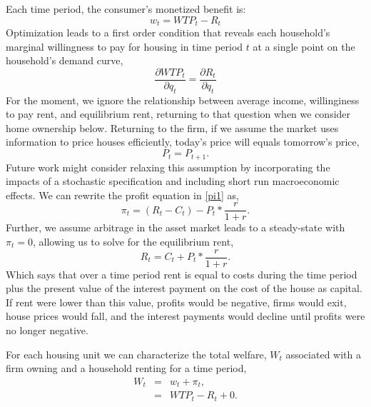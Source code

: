 \documentclass[ecta,nameyear,draft]{econsocart}
\theoremstyle{plain}
\theoremstyle{remark}
\begin{document}
Each time period, the consumer’s monetized benefit is:
\begin{equation*}
	 w_t=\mathit{WTP}_t-R_t
\end{equation*}
Optimization leads to a first order condition that reveals each household's marginal willingness
to pay for housing in time period $t$ at a single point on the household’s demand curve,
\begin{equation}
	\frac{\partial \mathit{WTP}_t}{\partial q_t}=\frac{\partial R_t}{\partial q_t} \label{foc}
\end{equation}
For the moment, we ignore the relationship between average income, willinginess to pay rent, and equilibrium rent, returning to that question when we consider home ownership below. Returning to the firm, if we assume the market uses information to price houses efficiently, today’s price will equals tomorrow’s
price,
\begin{equation*}
	P_t=P_{t+1}.
\end{equation*}
Future work might consider relaxing this assumption by incorporating the impacts of a stochastic
specification and including short run macroeconomic effects.
We can rewrite the profit equation in \ref{pi1} as,
\begin{equation}
	\pi_t=(R_t-C_t)-P_t*\frac{r}{1+r}.\label{pi1.1}
\end{equation}
Further, we assume arbitrage in the asset market leads to a steady-state with $\pi_t=0$, allowing us to solve for the equilibrium rent,
\begin{equation*}
	R_t=C_t+P_t*\frac{r}{1+r}.
\end{equation*}
Which says that over a time period rent is equal to costs during the time period plus the present value of
the interest payment on the cost of the house as capital. If rent were lower than this value, profits
would be negative, firms would exit, house prices would fall, and the interest payments would decline until profits were no longer negative.

For each housing unit we can characterize the total welfare, $W_t$ associated with a firm owning and a household renting for a time period,
\begin{eqnarray*}
	W_t & = & w_t+\pi_t,\\
	& = & \mathit{WTP}_t-R_t+0.
\end{eqnarray*}
\end{document}

